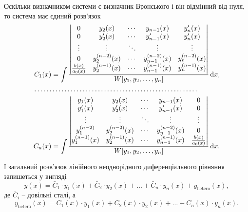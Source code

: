 Оскільки визначником системи є визначник Вронського і він відмінний від нуля, то система має єдиний роз\-в'яз\-ок
\begin{equation*}
	\begin{aligned}
		C_1(x) &= \int \frac{\begin{vmatrix} 0 & y_2(x) & \cdots & y_{n - 1}(x) & y_n'(x) \\ 0 & y_2'(x) & \cdots & y_{n - 1}'(x) & y_n'(x) \\ \vdots & \vdots & \ddots & \vdots & \vdots \\ 0 & y_2^{(n - 2)}(x) & \cdots & y_{n - 1}^{(n - 2)}(x) & y_n^{(n - 2)}(x) \\ \frac{b(x)}{a_0(x)} & y_2^{(n - 1)}(x) & \cdots & y_{n - 1}^{(n - 1)}(x) & y_n^{(n - 1)}(x) \end{vmatrix}}{W[y_1, y_2, \ldots, y_n]} \mathop{}\!\mathrm{d} x, \\
		\ldots \ldots & \ldots \ldots \ldots \ldots \ldots \ldots \ldots \ldots \ldots \ldots \ldots \ldots \ldots \ldots \ldots \ldots \\
		C_n(x) &= \int \frac{\begin{vmatrix} y_1(x) & y_2(x) & \cdots & y_{n - 1}(x) & 0 \\ y_1'(x) & y_2'(x) & \cdots & y_{n - 1}'(x) & 0 \\ \vdots & \vdots & \ddots & \vdots & \vdots \\ y_1^{(n - 2)} & y_2^{(n - 2)}(x) & \cdots & y_{n - 1}^{(n - 2)}(x) & 0 \\ y_1^{(n - 1)}(x) & y_2^{(n - 1)}(x) & \cdots & y_{n - 1}^{(n - 1)}(x) & \frac{b(x)}{a_0(x)} \end{vmatrix}}{W[y_1, y_2, \ldots, y_n]} \mathop{}\!\mathrm{d} x.
	\end{aligned}
\end{equation*}

І загальний розв’язок лінійного неоднорідного диференціального рівняння запишеться у вигляді
\begin{equation*}
	y(x) = \bar C_1 \cdot y_1(x) + \bar C_2 \cdot y_2(x) + \ldots + \bar C_n \cdot y_n(x) + y_{\text{hetero}}(x),
\end{equation*}
де $\bar C_i$ -- довільні сталі, а
\begin{equation*}
	y_{\text{hetero}}(x) = C_1(x) \cdot y_1(x) + C_2(x) \cdot y_2(x) + \ldots + C_n(x) \cdot y_n(x).
\end{equation*}

